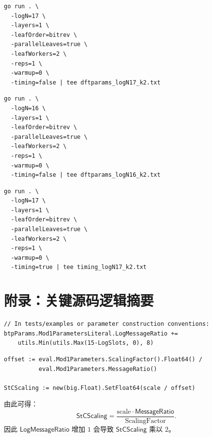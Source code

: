 \documentclass[UTF8,a4paper,11pt]{ctexart}
\newcommand{\LogMessageRatio}{\mathsf{LogMessageRatio}}
\newcommand{\MessageRatio}{\mathsf{MessageRatio}}
\newcommand{\StCScaling}{\mathsf{StCScaling}}
\begin{document}
\begin{lstlisting}[style=textstyle,caption={安全版 $\log N=17,k=2$ 诊断命令}]
go run . \
  -logN=17 \
  -layers=1 \
  -leafOrder=bitrev \
  -parallelLeaves=true \
  -leafWorkers=2 \
  -reps=1 \
  -warmup=0 \
  -timing=false | tee dftparams_logN17_k2.txt
\end{lstlisting}

\begin{lstlisting}[style=textstyle,caption={$\log N=16,k=2$ 对照诊断命令}]
go run . \
  -logN=16 \
  -layers=1 \
  -leafOrder=bitrev \
  -parallelLeaves=true \
  -leafWorkers=2 \
  -reps=1 \
  -warmup=0 \
  -timing=false | tee dftparams_logN16_k2.txt
\end{lstlisting}

\begin{lstlisting}[style=textstyle,caption={$\log N=17,k=2$ timing 命令}]
go run . \
  -logN=17 \
  -layers=1 \
  -leafOrder=bitrev \
  -parallelLeaves=true \
  -leafWorkers=2 \
  -reps=1 \
  -warmup=0 \
  -timing=true | tee timing_logN17_k2.txt
\end{lstlisting}

\section{附录：关键源码逻辑摘要}

\begin{lstlisting}[style=gostyle,caption={LogMessageRatio 补偿逻辑}]
// In tests/examples or parameter construction conventions:
btpParams.Mod1ParametersLiteral.LogMessageRatio +=
    utils.Min(utils.Max(15-LogSlots, 0), 8)
\end{lstlisting}

\begin{lstlisting}[style=gostyle,caption={MessageRatio 进入 StCScaling}]
offset := eval.Mod1Parameters.ScalingFactor().Float64() /
          eval.Mod1Parameters.MessageRatio()

StCScaling := new(big.Float).SetFloat64(scale / offset)
\end{lstlisting}

由此可得：
\begin{equation}
\StCScaling
=
\frac{\mathrm{scale}\cdot\MessageRatio}{\mathrm{ScalingFactor}}.
\end{equation}
因此 $\LogMessageRatio$ 增加 $1$ 会导致 $\StCScaling$ 乘以 $2$。
\end{document}

